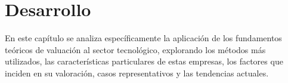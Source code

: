 \chapter{Desarrollo}

En este capítulo se analiza específicamente la aplicación de los fundamentos teóricos de valuación al sector tecnológico, explorando los métodos más utilizados, las características particulares de estas empresas, los factores que inciden en su valoración, casos representativos y las tendencias actuales.





 